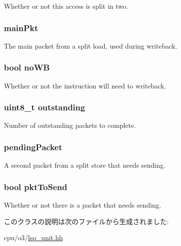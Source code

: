 Whether or not this access is split in two. \hypertarget{classLSQUnit_1_1LSQSenderState_aef239ed2096a497e3f46123fb622a6ce}{
\subsubsection[{mainPkt}]{ {\bf mainPkt}}}
\label{classLSQUnit_1_1LSQSenderState_aef239ed2096a497e3f46123fb622a6ce}
The main packet from a split load, used during writeback. \hypertarget{classLSQUnit_1_1LSQSenderState_aee33f1eef98f14502c88334f70e6c03d}{
\subsubsection[{noWB}]{\setlength{\rightskip}{0pt plus 5cm}bool {\bf noWB}}}
\label{classLSQUnit_1_1LSQSenderState_aee33f1eef98f14502c88334f70e6c03d}
Whether or not the instruction will need to writeback. \hypertarget{classLSQUnit_1_1LSQSenderState_a9acbf52ad6e4c142c8b125cb53c13226}{
\subsubsection[{outstanding}]{\setlength{\rightskip}{0pt plus 5cm}uint8\_\-t {\bf outstanding}}}
\label{classLSQUnit_1_1LSQSenderState_a9acbf52ad6e4c142c8b125cb53c13226}
Number of outstanding packets to complete. \hypertarget{classLSQUnit_1_1LSQSenderState_a25b58d4e62313febd9739ff9d1499e9a}{
\subsubsection[{pendingPacket}]{ {\bf pendingPacket}}}
\label{classLSQUnit_1_1LSQSenderState_a25b58d4e62313febd9739ff9d1499e9a}
A second packet from a split store that needs sending. \hypertarget{classLSQUnit_1_1LSQSenderState_aaa537e4674fbcde1b08a2e0d3f5f7f41}{
\subsubsection[{pktToSend}]{\setlength{\rightskip}{0pt plus 5cm}bool {\bf pktToSend}}}
\label{classLSQUnit_1_1LSQSenderState_aaa537e4674fbcde1b08a2e0d3f5f7f41}
Whether or not there is a packet that needs sending. 

このクラスの説明は次のファイルから生成されました:\begin{DoxyCompactItemize}
\item 
cpu/o3/\hyperlink{o3_2lsq__unit_8hh}{lsq\_\-unit.hh}\end{DoxyCompactItemize}
